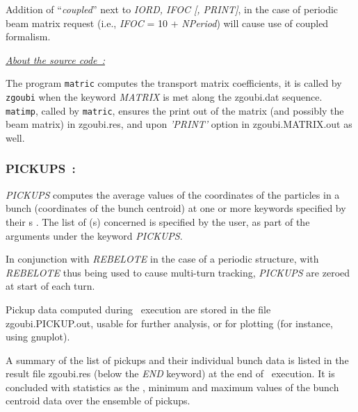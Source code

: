 {\noindent  Addition of ``\textsl{coupled}'' next to \textsl{IORD, IFOC [, PRINT]}, in the case of 
periodic beam matrix request (i.e., \textsl{IFOC} = 10  +  \textsl{NPeriod}) will cause use of coupled formalism. 





\bigskip


\noindent \underline{\textsl{About the source code~: }}

\medskip

\noindent The program \texttt{matric} computes the transport matrix coefficients, 
 it is called by \texttt{zgoubi} when the 
keyword \textsl{MATRIX} is met along the zgoubi.dat sequence. 
\texttt{matimp}, called by  \texttt{matric}, 
ensures the print out of the matrix (and possibly the beam matrix) in zgoubi.res, and upon 
\textsl{'PRINT'} option in zgoubi.MATRIX.out as well. 



\smallskip






\newpage

 
\subsubsection{PICKUPS~: \PICKUPSTitl}\label{PICKUPS} 
\medskip

\noindent \textsl{PICKUPS} computes the average values of the coordinates of the  particles in a bunch
 (coordinates of the bunch centroid)  
at one or more keywords specified by their {\LABEL}s . 
The list of \LABEL(s) concerned is specified by the user, as part of the arguments under the keyword  \textsl{PICKUPS}.

\medskip

\noindent In conjunction with \textsl{REBELOTE} in the case of a periodic structure, 
with  \textsl{REBELOTE} thus being used to cause multi-turn tracking,
  \textsl{PICKUPS}  are zeroed at start of each turn. 
 
\medskip

\noindent Pickup data computed during \zgou\ execution are stored in the file zgoubi.PICKUP.out, 
usable for further analysis, or for plotting (for instance, using gnuplot). 

\medskip

\noindent A summary of the list of pickups and their individual bunch data is  listed 
in the result file zgoubi.res  (below the   \textsl{END}   keyword) 
at the end of \zgou\ execution. It is concluded with statistics as the \rms, minimum and maximum values 
of the bunch centroid data over the ensemble of pickups. 




}
